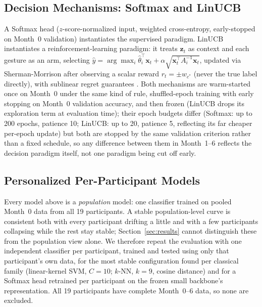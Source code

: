 \documentclass{article}
\begin{document}
\subsection{Decision Mechanisms: Softmax and LinUCB}
A Softmax head ($z$-score-normalized input, weighted cross-entropy, early-stopped on Month~0 validation) instantiates the supervised paradigm. LinUCB \cite{Li2010LinUCB} instantiates a reinforcement-learning paradigm: it treats $\mathbf{z}_t$ as context and each gesture as an arm, selecting $\hat y=\arg\max_i \hat\theta_i^\top \mathbf{x}_t+\alpha\sqrt{\mathbf{x}_t^\top A_i^{-1}\mathbf{x}_t}$, updated via Sherman-Morrison after observing a scalar reward $r_t=\pm w_{c^*}$ (never the true label directly), with sublinear regret guarantees \cite{Chu2011Regret}. Both mechanisms are warm-started once on Month~0 under the same kind of rule, shuffled-epoch training with early stopping on Month~0 validation accuracy, and then frozen (LinUCB drops its exploration term at evaluation time); their epoch budgets differ (Softmax: up to 200 epochs, patience 10; LinUCB: up to 20, patience 5, reflecting its far cheaper per-epoch update) but both are stopped by the same validation criterion rather than a fixed schedule, so any difference between them in Month~1--6 reflects the decision paradigm itself, not one paradigm being cut off early.

\subsection{Personalized Per-Participant Models}
Every model above is a \emph{population} model: one classifier trained on pooled Month~0 data from all 19 participants. A stable population-level curve is consistent both with every participant drifting a little and with a few participants collapsing while the rest stay stable; Section~\ref{sec:results} cannot distinguish these from the population view alone. We therefore repeat the evaluation with one independent classifier per participant, trained and tested using only that participant's own data, for the most stable configuration found per classical family (linear-kernel SVM, $C{=}10$; $k$-NN, $k{=}9$, cosine distance) and for a Softmax head retrained per participant on the frozen small backbone's representation. All 19 participants have complete Month~0--6 data, so none are excluded.
\end{document}
